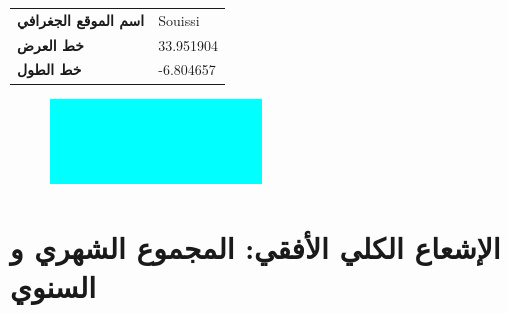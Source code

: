 \documentclass[11pt,a4paper]{article}
\begin{document}
\begin{table}[h!]
\begin{tabular} { p{3cm}p{5cm} }
 \textbf{\textarabic{  اسم الموقع الجغرافي }} &
\cellcolor[HTML]{ FFFFFF } Souissi

\\

 \textbf{\textarabic{  خط العرض }} &
\cellcolor[HTML]{ FFFFFF } 33.951904

\\

 \textbf{\textarabic{  خط الطول }} &
\cellcolor[HTML]{ FFFFFF } -6.804657

\\

\end{tabular}
\end{table}
\begin{figure}[h]
\centering
\includegraphics[width=0.5\textwidth]{overview_map.png}
\end{figure}

\section{ الإشعاع الكلي الأفقي: المجموع الشهري و السنوي }

\newpage
\end{document}
